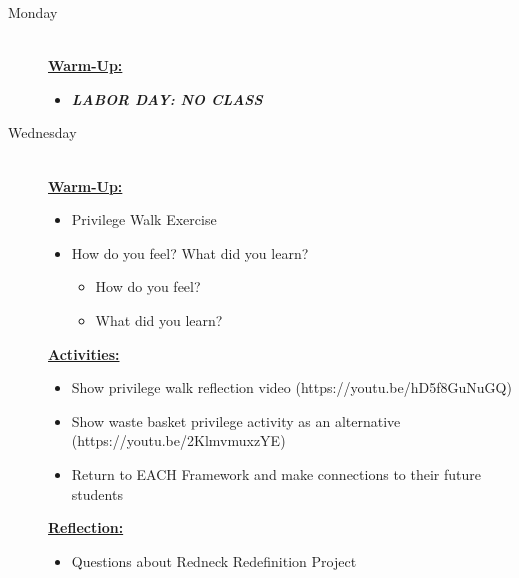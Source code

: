 \documentclass{article}
\newcommand{\listmon}{\item[\large\textsf{Monday}\normalsize] \hfill \\}
\newcommand{\listwed}{\item[\large\textsf{Wednesday}\normalsize] \hfill \\}
\newenvironment{daywu}
	{\underline{\textbf{Warm-Up:}} \hfill \\
	\begin{itemize}}
	{\end{itemize}}
\newenvironment{dayact}
	{\underline{\textbf{Activities:}} \hfill \\
	\begin{itemize}}
	{\end{itemize}}
\newenvironment{dayref}
	{\underline{\textbf{Reflection:}} \hfill \\
	\begin{itemize}}
	{\end{itemize}}
\newenvironment{weeksched}
	{\noindent
	\begin{description}}
	{\end{description}
	\newpage}
\begin{document}
\begin{weeksched}

\listmon
\begin{daywu}
	\item \textbf{\textit{LABOR DAY: NO CLASS}}
\end{daywu}

\listwed
\begin{daywu}
	\item Privilege Walk Exercise
	\item How do you feel? What did you learn?
	\begin{itemize}
		\item How do you feel?
		\item What did you learn?
	\end{itemize}
\end{daywu}
\begin{dayact}
	\item Show privilege walk reflection video (https://youtu.be/hD5f8GuNuGQ)
	\item Show waste basket privilege activity as an alternative (https://youtu.be/2KlmvmuxzYE)
	\item Return to EACH Framework and make connections to their future students
\end{dayact}
\begin{dayref}
	\item Questions about Redneck Redefinition Project
\end{dayref}
\end{weeksched}
\end{document}
